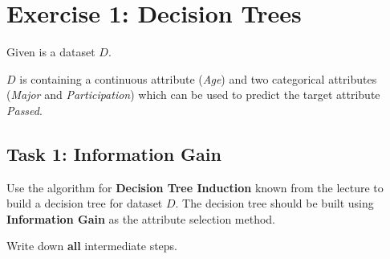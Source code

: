 \documentclass[
english,
smallborders
]{i6prcsht}
\begin{document}
\section*{Exercise 1: Decision Trees}

\begin{minipage}{.5\textwidth}
	Given is a dataset $D$.
	
	\vspace*{0.5cm}
	
	$D$ is containing a continuous attribute (\textit{Age}) and two categorical attributes (\textit{Major} and \textit{Participation}) which can be used to predict the target attribute \textit{Passed}.
\end{minipage}
\begin{minipage}{.5\textwidth}
	\begin{flushright}
	\end{flushright}
\end{minipage}

\subsection*{Task 1: Information Gain}

Use the algorithm for \textbf{Decision Tree Induction} known from the lecture to build a decision tree for dataset $D$. The decision tree should be built using \textbf{Information Gain} as the attribute selection method.

Write down \textbf{all} intermediate steps.
\end{document}

